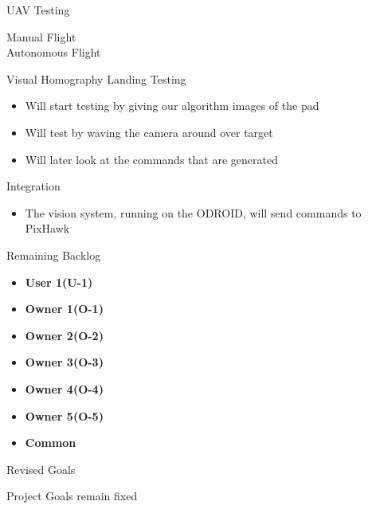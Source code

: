 \documentclass[11pt]{beamer}
\begin{document}
\begin{frame}{UAV Testing}

Manual Flight \\
Autonomous Flight \\

\end{frame}

\begin{frame}{Visual Homography Landing Testing}
	\begin{itemize}
		\item Will start testing by giving our algorithm images of the pad
		\item Will test by waving the camera around over target
		\item Will later look at the commands that are generated
	\end{itemize}
\end{frame}

\begin{frame}{Integration}
	\begin{itemize}
		\item The vision system, running on the ODROID, will send commands to PixHawk
	\end{itemize}
\end{frame}


\begin{frame}{Remaining Backlog}
\begin{itemize}
\item \textbf{User 1(U-1)}
\item \textbf{Owner 1(O-1)}
\item \textbf{Owner 2(O-2)}
\item \textbf{Owner 3(O-3)}
\item \textbf{Owner 4(O-4)}
\item \textbf{Owner 5(O-5)}
\item \textbf{Common}
\end{itemize}

\end{frame}


\begin{frame}{Revised Goals}

Project Goals remain fixed

\end{frame}
\end{document}
